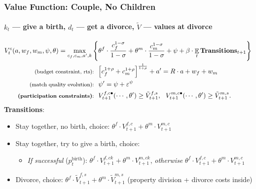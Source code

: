 \documentclass[aspectratio=169]{beamer}
\DeclareMathOperator{\E}{\mathbb{E}}
\let\olditem\item
\renewcommand{\item}{%
\olditem\vspace{\fill}}
\begin{document}
\begin{frame}
\frametitle{Value Function: Couple, No Children}
\framesubtitle{$k_t$ --- give a birth, $d_t$ --- get a divorce, $\tilde{V}$ --- values at divorce}
\begin{align*}
V^{c}_t(a,w_f,w_m,\psi,\theta) = \max\limits_{c_f,c_m,a',k} \Bigg\{ & \theta^f \cdot \frac{c_f^{1-\sigma}}{{1-\sigma}}  + \theta^m \cdot \frac{c_m^{1-\sigma}}{1-\sigma}  + \psi + \beta \cdot \E_t \text{\textbf{Transitions}}_{t+1} \Bigg\}   \\
\text{ \footnotesize (budget constraint, rts): \ } &{\normalsize \left[c_f^{1+\rho} + c_m^{1+\rho}\right]^{\frac1{1+\rho}} + a' = R\cdot a + w_f + w_m}\\
\text{ \footnotesize (match quality evolution): \ } &{\normalsize \psi' = \psi + \varepsilon^{\psi}}\\
\text{ \footnotesize \textbf{(participation constraints)}: \ } &{\normalsize V^{f,c\bullet}_{t+1} (\cdots,\theta') \geq \tilde{V}^{f,s}_{t+1}, \ \ V^{m,c\bullet}_{t+1} (\cdots,\theta') \geq \tilde{V}^{m,s}_{t+1}.}
\end{align*}
\textbf{Transitions}:
\begin{itemize}
\item  \footnotesize Stay together, no birth, choice: $\theta^f \cdot V^{f,c}_{t+1} + \theta^m \cdot V^{m,c}_{t+1}$
\item  \footnotesize Stay together, try to give a birth, choice:
\begin{itemize}
\item  \footnotesize  \textit{If successful} ($p^{\text{birth}}_t$):  $\theta^f\cdot V^{f,ck}_{t+1} + \theta^m\cdot V^{m,ck}_{t+1}$, \textit{otherwise} $\theta^f\cdot V^{f,c}_{t+1} + \theta^m\cdot V^{m,c}_{t+1}$
\end{itemize}
\item  \footnotesize  Divorce, choice: $\theta^f \cdot \tilde V^{f,s}_{t+1} + \theta^m \cdot \tilde V^{m,s}_{t+1}$ (property division + divorce costs inside)
\end{itemize}
\end{frame}
\end{document}
